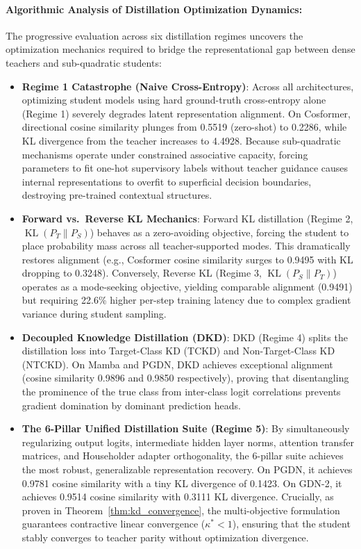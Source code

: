 \documentclass{article}
\begin{document}


\paragraph{Algorithmic Analysis of Distillation Optimization Dynamics:}
The progressive evaluation across six distillation regimes uncovers the optimization mechanics required to bridge the representational gap between dense teachers and sub-quadratic students:
\begin{itemize}
    \item \textbf{Regime 1 Catastrophe (Naive Cross-Entropy)}: Across all architectures, optimizing student models using hard ground-truth cross-entropy alone (Regime 1) severely degrades latent representation alignment. On Cosformer, directional cosine similarity plunges from 0.5519 (zero-shot) to 0.2286, while KL divergence from the teacher increases to 4.4928. Because sub-quadratic mechanisms operate under constrained associative capacity, forcing parameters to fit one-hot supervisory labels without teacher guidance causes internal representations to overfit to superficial decision boundaries, destroying pre-trained contextual structures.
    \item \textbf{Forward vs.\ Reverse KL Mechanics}: Forward KL distillation (Regime 2, $\operatorname{KL}(P_T \parallel P_S)$) behaves as a zero-avoiding objective, forcing the student to place probability mass across all teacher-supported modes. This dramatically restores alignment (e.g., Cosformer cosine similarity surges to 0.9495 with KL dropping to 0.3248). Conversely, Reverse KL (Regime 3, $\operatorname{KL}(P_S \parallel P_T)$) operates as a mode-seeking objective, yielding comparable alignment (0.9491) but requiring 22.6\% higher per-step training latency due to complex gradient variance during student sampling.
    \item \textbf{Decoupled Knowledge Distillation (DKD)}: DKD (Regime 4) splits the distillation loss into Target-Class KD (TCKD) and Non-Target-Class KD (NTCKD). On Mamba and PGDN, DKD achieves exceptional alignment (cosine similarity 0.9896 and 0.9850 respectively), proving that disentangling the prominence of the true class from inter-class logit correlations prevents gradient domination by dominant prediction heads.
    \item \textbf{The 6-Pillar Unified Distillation Suite (Regime 5)}: By simultaneously regularizing output logits, intermediate hidden layer norms, attention transfer matrices, and Householder adapter orthogonality, the 6-pillar suite achieves the most robust, generalizable representation recovery. On PGDN, it achieves 0.9781 cosine similarity with a tiny KL divergence of 0.1423. On GDN-2, it achieves 0.9514 cosine similarity with 0.3111 KL divergence. Crucially, as proven in Theorem~\ref{thm:kd_convergence}, the multi-objective formulation guarantees contractive linear convergence ($\kappa^* < 1$), ensuring that the student stably converges to teacher parity without optimization divergence.

\end{itemize}
\end{document}
